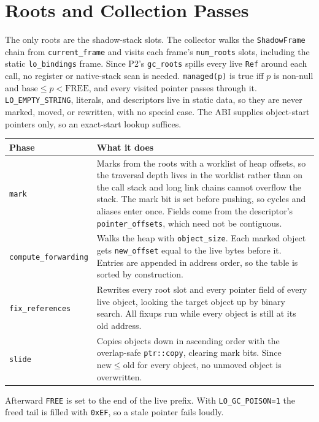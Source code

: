 \documentclass[10pt]{article}
\newcommand{\code}[1]{\texttt{\small #1}}
\begin{document}
\section{Roots and Collection Passes}
The only roots are the shadow-stack slots. The collector walks the \code{ShadowFrame} chain from \code{current\_frame} and visits each frame's \code{num\_roots} slots, including the static \code{lo\_bindings} frame. Since P2's \code{gc\_roots} spills every live \code{Ref} around each call, no register or native-stack scan is needed. \code{managed(p)} is true iff $p$ is non-null and $\mathrm{base}\le p<\mathrm{FREE}$, and every visited pointer passes through it. \code{LO\_EMPTY\_STRING}, literals, and descriptors live in static data, so they are never marked, moved, or rewritten, with no special case. The ABI supplies object-start pointers only, so an exact-start lookup suffices.

\begin{center}\small
\begin{tabularx}{\linewidth}{@{}l X@{}}
\toprule
\textbf{Phase} & \textbf{What it does} \\
\midrule
\code{mark} & Marks from the roots with a worklist of heap offsets, so the traversal depth lives in the worklist rather than on the call stack and long link chains cannot overflow the stack. The mark bit is set before pushing, so cycles and aliases enter once. Fields come from the descriptor's \code{pointer\_offsets}, which need not be contiguous. \\
\code{compute\_forwarding} & Walks the heap with \code{object\_size}. Each marked object gets \code{new\_offset} equal to the live bytes before it. Entries are appended in address order, so the table is sorted by construction. \\
\code{fix\_references} & Rewrites every root slot and every pointer field of every live object, looking the target object up by binary search. All fixups run while every object is still at its old address. \\
\code{slide} & Copies objects down in ascending order with the overlap-safe \code{ptr::copy}, clearing mark bits. Since $\mathrm{new}\le\mathrm{old}$ for every object, no unmoved object is overwritten. \\
\bottomrule
\end{tabularx}
\end{center}
Afterward \code{FREE} is set to the end of the live prefix. With \code{LO\_GC\_POISON=1} the freed tail is filled with \code{0xEF}, so a stale pointer fails loudly.
\end{document}
